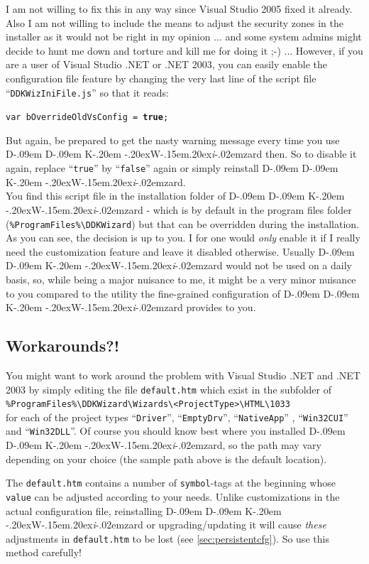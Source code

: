 \documentclass[a4paper,titlepage]{report}
\def\ddkwiz{D\kern-.09em D\kern-.09em K\kern-.20em \raise-.20ex\hbox{W}\kern-.15em\raise.20ex\hbox{\it{i}}\kern-.02em{zard}}
\begin{document}
I am not willing to fix this in any way since Visual Studio 2005 fixed it already.
Also I am not willing to include the means to adjust the security zones in
the installer as it would not be right in my opinion ... and some system admins
might decide to hunt me down and torture and kill me for doing it \textsf{;-)} ...
However, if you are a user of Visual Studio .NET or .NET 2003, you can easily
enable the configuration file feature by changing the very last line of the
script file ``\texttt{DDKWizIniFile.js}'' so that it reads:

\texttt{var bOverrideOldVsConfig = \textbf{true};}

But again, be prepared to get the nasty warning message every time you use \ddkwiz{}
then. So to disable it again, replace ``\texttt{true}'' by ``\texttt{false}'' again
or simply reinstall \ddkwiz{}.\\

You find this script file in the installation folder of \ddkwiz{} - which is by
default in the program files folder
(\verb+%ProgramFiles%\DDKWizard+) but that can be overridden during the installation.\\

As you can see, the decision is up to you. I for one would \emph{only} enable it if
I really need the customization feature and leave it disabled otherwise. Usually
\ddkwiz{} would not be used on a daily basis, so, while being a major nuisance
to me, it might be a very minor nuisance to you compared to the utility the
fine-grained configuration of \ddkwiz{} provides to you.

\subsection{Workarounds?!}
You might want to work around the problem with Visual Studio .NET and .NET 2003
by simply editing the file \texttt{default.htm} which exist in the subfolder of\\
\verb+%ProgramFiles%\DDKWizard\Wizards\<ProjectType>\HTML\1033+\\
for each of the
project types ``\texttt{Driver}'', ``\texttt{EmptyDrv}'', ``\texttt{NativeApp}''
, ``\texttt{Win32CUI}'' and ``\texttt{Win32DLL}''. Of course you should know best where you installed
\ddkwiz{}, so the path may vary depending on your choice (the sample path above
is the default location).

The \texttt{default.htm} contains a number of \texttt{symbol}-tags at the beginning
whose \texttt{value} can be adjusted according to your needs. Unlike customizations
in the actual configuration file, reinstalling \ddkwiz{} or
upgrading/updating it will cause \emph{these} adjustments in \texttt{default.htm}
to be lost (see \autoref{sec:persistentcfg}). So use this method carefully!
\end{document}
